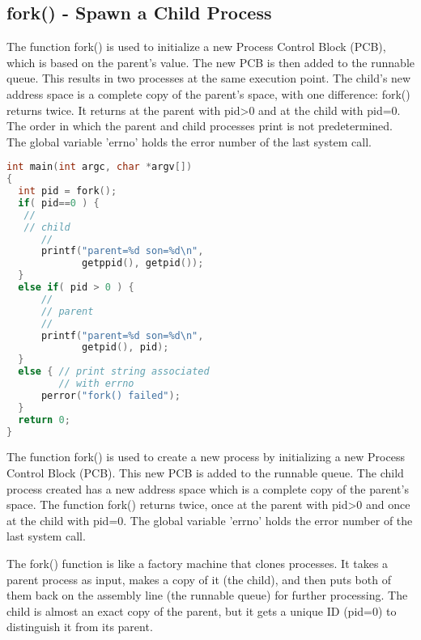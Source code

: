 \documentclass[12pt]{article}
\begin{document}
\subsection*{fork() - Spawn a Child Process} The function fork() is used to initialize a new Process Control Block (PCB), which is based on the parent's value. The new PCB is then added to the runnable queue. This results in two processes at the same execution point. The child's new address space is a complete copy of the parent's space, with one difference: fork() returns twice. It returns at the parent with pid>0 and at the child with pid=0. The order in which the parent and child processes print is not predetermined. The global variable 'errno' holds the error number of the last system call.
\begin{lstlisting}[language=C]
int main(int argc, char *argv[])
{
  int pid = fork();
  if( pid==0 ) { 
   //
   // child
      //
      printf("parent=%d son=%d\n",
             getppid(), getpid());
  }
  else if( pid > 0 ) {
      //
      // parent
      //
      printf("parent=%d son=%d\n",
             getpid(), pid);
  }
  else { // print string associated
         // with errno   
      perror("fork() failed"); 
  }
  return 0;
}
\end{lstlisting}
\begin{tcolorbox}[colback=yellow!5, colframe=yellow!80!black, title={\faBookmark À retenir}]
The function fork() is used to create a new process by initializing a new Process Control Block (PCB). This new PCB is added to the runnable queue. The child process created has a new address space which is a complete copy of the parent's space. The function fork() returns twice, once at the parent with pid>0 and once at the child with pid=0. The global variable 'errno' holds the error number of the last system call.
\end{tcolorbox}
\begin{tcolorbox}[colback=green!5, colframe=green!75!black, title={\faLightbulb Intuition}]
The fork() function is like a factory machine that clones processes. It takes a parent process as input, makes a copy of it (the child), and then puts both of them back on the assembly line (the runnable queue) for further processing. The child is almost an exact copy of the parent, but it gets a unique ID (pid=0) to distinguish it from its parent.
\end{tcolorbox}
\end{document}
